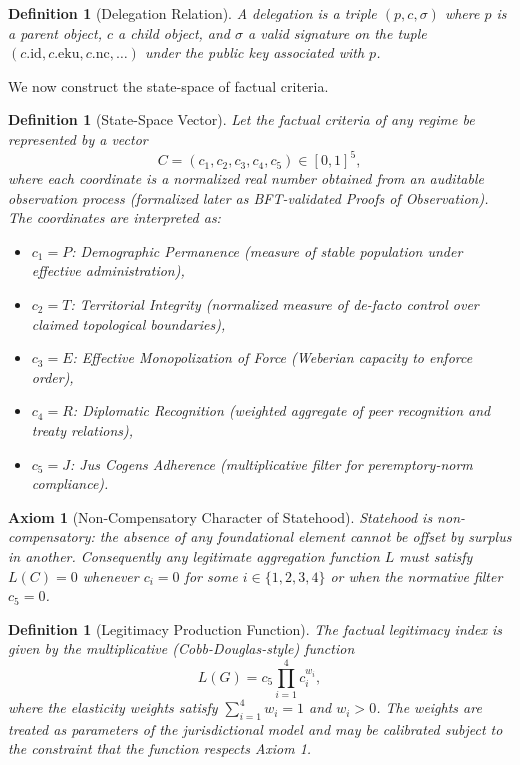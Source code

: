 \documentclass[11pt,a4paper]{article}
\newtheorem{definition}[theorem]{Definition}
\newtheorem{axiom}[theorem]{Axiom}
\begin{document}
\begin{definition}[Delegation Relation]
A \emph{delegation} is a triple \((p, c, \sigma)\) where \(p\) is a parent object, \(c\) a child object, and \(\sigma\) a valid signature on the tuple \((c.\text{id}, c.\text{eku}, c.\text{nc}, \dots)\) under the public key associated with \(p\).
\end{definition}

We now construct the state-space of factual criteria.

\begin{definition}[State-Space Vector]
Let the factual criteria of any regime be represented by a vector
\[
C = (c_1, c_2, c_3, c_4, c_5) \in [0,1]^5,
\]
where each coordinate is a normalized real number obtained from an auditable observation process (formalized later as BFT-validated Proofs of Observation). The coordinates are interpreted as:
\begin{itemize}
\item \(c_1 = P\): Demographic Permanence (measure of stable population under effective administration),
\item \(c_2 = T\): Territorial Integrity (normalized measure of de-facto control over claimed topological boundaries),
\item \(c_3 = E\): Effective Monopolization of Force (Weberian capacity to enforce order),
\item \(c_4 = R\): Diplomatic Recognition (weighted aggregate of peer recognition and treaty relations),
\item \(c_5 = J\): Jus Cogens Adherence (multiplicative filter for peremptory-norm compliance).
\end{itemize}
\end{definition}

\begin{axiom}[Non-Compensatory Character of Statehood]
Statehood is non-compensatory: the absence of any foundational element cannot be offset by surplus in another. Consequently any legitimate aggregation function \(L\) must satisfy \(L(C) = 0\) whenever \(c_i = 0\) for some \(i \in \{1,2,3,4\}\) or when the normative filter \(c_5 = 0\).
\end{axiom}

\begin{definition}[Legitimacy Production Function]
The factual legitimacy index is given by the multiplicative (Cobb-Douglas-style) function
\[
L(G) = c_5 \prod_{i=1}^{4} c_i^{w_i},
\]
where the elasticity weights satisfy \(\sum_{i=1}^{4} w_i = 1\) and \(w_i > 0\). The weights are treated as parameters of the jurisdictional model and may be calibrated subject to the constraint that the function respects Axiom 1.
\end{definition}
\end{document}
